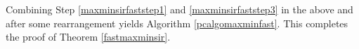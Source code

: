 \documentclass[10pt,twocolumn]{IEEEtran}
\newcommand{\0}{\mathbf{0}}
\newcommand{\1}{\mathbf{1}}
\begin{document}
Combining Step \ref{maxminsirfaststep1} and \ref{maxminsirfaststep3} in the above and after some rearrangement yields Algorithm \ref{pcalgomaxminfast}.
This completes the proof of Theorem \ref{fastmaxminsir}.
%
%
%
\end{document}
